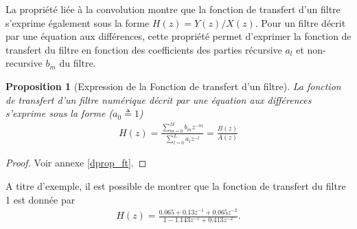 \documentclass[11pt,a4paper]{IEEEtran}
\newtheorem{proposition}{Proposition}
\begin{document}
La propriété liée à la convolution montre que la fonction de transfert d'un filtre s'exprime également sous la forme $H(z)=Y(z)/X(z)$. Pour un filtre décrit par une équation aux différences, cette propriété permet d'exprimer la fonction de transfert du filtre en fonction des coefficients des parties récursive $a_l$ et non-recursive $b_m$ du filtre.
\begin{proposition}[Expression de la Fonction de transfert d'un filtre] La fonction de transfert d'un filtre numérique décrit par une équation aux différences s'exprime sous la forme ($a_0\triangleq 1$)
\begin{align*}
H(z)=\frac{\sum_{m=0}^{M}b_m z^{-m}}{\sum_{l=0}^{L}a_l z^{-l}}=\frac{B(z)}{A(z)}
\end{align*}\label{prop_ft}
\end{proposition}
\begin{proof}
Voir annexe \ref{dprop_ft}.
\end{proof}

A titre d'exemple, il est possible de montrer que la fonction de transfert du filtre 1 est donnée par 
\begin{align}
H(z)=\frac{0.065+0.13 z^{-1}+0.065z^{-2}}{1-1.143z^{-1}+0.413z^{-2}}.
\end{align}
%
\end{document}
